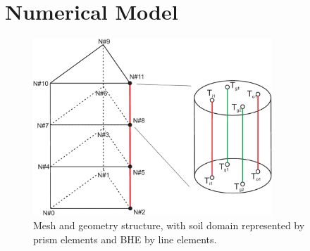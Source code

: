 \section{Numerical Model}
\begin{figure}
\begin{center}
\includegraphics[width=0.8\textwidth]{fig/simple_mesh_geometry}
\end{center}
\caption{Mesh and geometry structure, with soil domain represented by prism elements and BHE by line elements. }
\label{fig:simple_mesh}
\end{figure}

